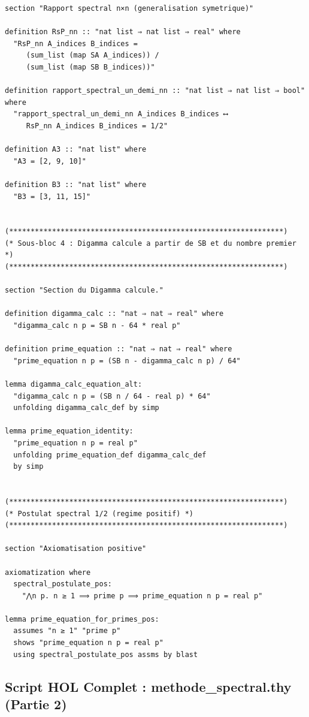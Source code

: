 \documentclass[a4paper,11pt]{article}
\begin{document}
\begin{holcode}[title={\textcolor{white}{Fichier : methode\_spectral.thy -- Partie 1/4}}]
\begin{lstlisting}
section "Rapport spectral n×n (generalisation symetrique)"

definition RsP_nn :: "nat list ⇒ nat list ⇒ real" where
  "RsP_nn A_indices B_indices =
     (sum_list (map SA A_indices)) /
     (sum_list (map SB B_indices))"

definition rapport_spectral_un_demi_nn :: "nat list ⇒ nat list ⇒ bool" where
  "rapport_spectral_un_demi_nn A_indices B_indices ⟷
     RsP_nn A_indices B_indices = 1/2"

definition A3 :: "nat list" where
  "A3 = [2, 9, 10]"

definition B3 :: "nat list" where
  "B3 = [3, 11, 15]"


(****************************************************************)
(* Sous-bloc 4 : Digamma calcule a partir de SB et du nombre premier *)
(****************************************************************)

section "Section du Digamma calcule."

definition digamma_calc :: "nat ⇒ nat ⇒ real" where
  "digamma_calc n p = SB n - 64 * real p"

definition prime_equation :: "nat ⇒ nat ⇒ real" where
  "prime_equation n p = (SB n - digamma_calc n p) / 64"

lemma digamma_calc_equation_alt:
  "digamma_calc n p = (SB n / 64 - real p) * 64"
  unfolding digamma_calc_def by simp

lemma prime_equation_identity:
  "prime_equation n p = real p"
  unfolding prime_equation_def digamma_calc_def
  by simp


(****************************************************************)
(* Postulat spectral 1/2 (regime positif) *)
(****************************************************************)

section "Axiomatisation positive"

axiomatization where
  spectral_postulate_pos:
    "⋀n p. n ≥ 1 ⟹ prime p ⟹ prime_equation n p = real p"

lemma prime_equation_for_primes_pos:
  assumes "n ≥ 1" "prime p"
  shows "prime_equation n p = real p"
  using spectral_postulate_pos assms by blast
\end{lstlisting}
\end{holcode}

\newpage
\subsection{Script HOL Complet : methode\_spectral.thy (Partie 2)}
\end{document}

